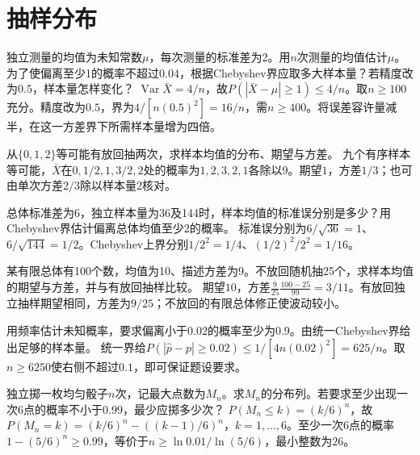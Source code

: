 \par\addvspace{12pt}

\section{抽样分布}

独立测量的均值为未知常数\(\mu\)，每次测量的标准差为2。用\(n\)次测量的均值估计\(\mu\)。为了使偏离至少1的概率不超过\(0.04\)，根据Chebyshev界应取多大样本量？若精度改为\(0.5\)，样本量怎样变化？
\solutionanswer
\(\operatorname{Var}\bar X=4/n\)，故\(P(|\bar X-\mu|\ge1)\le4/n\)。取\(n\ge100\)充分。精度改为\(0.5\)，界为\(4/[n(0.5)^2]=16/n\)，需\(n\ge400\)。将误差容许量减半，在这一方差界下所需样本量增为四倍。


从\(\{0,1,2\}\)等可能有放回抽两次，求样本均值的分布、期望与方差。
\solutionanswer
九个有序样本等可能，\(\bar X\)在\(0,1/2,1,3/2,2\)处的概率为\(1,2,3,2,1\)各除以\(9\)。期望\(1\)，方差\(1/3\)；也可由单次方差\(2/3\)除以样本量2核对。


总体标准差为6，独立样本量为36及144时，样本均值的标准误分别是多少？用Chebyshev界估计偏离总体均值至少2的概率。
\solutionanswer
标准误分别为\(6/\sqrt{36}=1\)、\(6/\sqrt{144}=1/2\)。Chebyshev上界分别\(1/2^2=1/4\)、\((1/2)^2/2^2=1/16\)。


某有限总体有100个数，均值为10、描述方差为9。不放回随机抽25个，求样本均值的期望与方差，并与有放回抽样比较。
\solutionanswer
期望\(10\)，方差\(\frac9{25}\frac{100-25}{99}=3/11\)。有放回独立抽样期望相同，方差为\(9/25\)；不放回的有限总体修正使波动较小。


用频率估计未知概率，要求偏离小于\(0.02\)的概率至少为\(0.9\)。由统一Chebyshev界给出足够的样本量。
\solutionanswer
统一界给\(P(|\widehat p-p|\ge0.02)\le1/[4n(0.02)^2]=625/n\)。取\(n\ge6250\)使右侧不超过\(0.1\)，即可保证题设要求。


独立掷一枚均匀骰子\(n\)次，记最大点数为\(M_n\)。求\(M_n\)的分布列。若要求至少出现一次6点的概率不小于\(0.99\)，最少应掷多少次？
\solutionanswer
\(P(M_n\le k)=(k/6)^n\)，故\(P(M_n=k)=(k/6)^n-((k-1)/6)^n\)，\(k=1,\ldots,6\)。至少一次6点的概率\(1-(5/6)^n\ge0.99\)，等价于\(n\ge\ln0.01/\ln(5/6)\)，最小整数为\(26\)。


